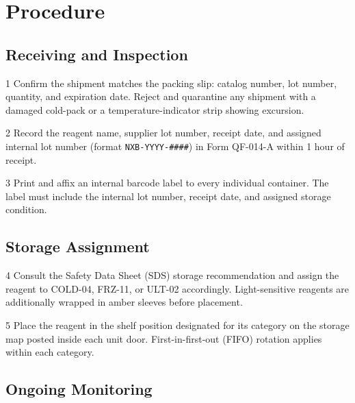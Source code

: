 \section{Procedure}

\subsection{Receiving and Inspection}

\begin{procstep}{1}
Confirm the shipment matches the packing slip: catalog number, lot number, quantity, and
expiration date. Reject and quarantine any shipment with a damaged cold-pack or a
temperature-indicator strip showing excursion.
\end{procstep}

\begin{procstep}{2}
Record the reagent name, supplier lot number, receipt date, and assigned internal lot
number (format \texttt{NXB-YYYY-\#\#\#\#}) in Form QF-014-A within 1 hour of receipt.
\end{procstep}

\begin{procstep}{3}
Print and affix an internal barcode label to every individual container. The label must
include the internal lot number, receipt date, and assigned storage condition.
\end{procstep}

\subsection{Storage Assignment}

\begin{procstep}{4}
Consult the Safety Data Sheet (SDS) storage recommendation and assign the reagent to
COLD-04, FRZ-11, or ULT-02 accordingly. Light-sensitive reagents are additionally wrapped
in amber sleeves before placement.
\end{procstep}

\begin{procstep}{5}
Place the reagent in the shelf position designated for its category on the storage map
posted inside each unit door. First-in-first-out (FIFO) rotation applies within each
category.
\end{procstep}

\subsection{Ongoing Monitoring}

